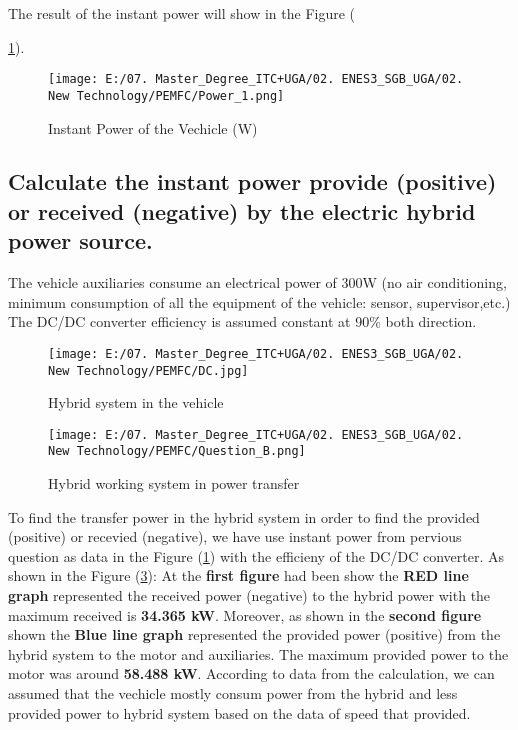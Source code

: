 \documentclass[12pt,a4paper]{article}
\numberwithin{equation}{section}
\begin{document}
	 The result of the instant power will show in the Figure ({\ref{5}).
	 
	 \begin{figure}[h]
	 	\centering 
	 	\texttt{[image: E:/07. Master\_Degree\_ITC+UGA/02. ENES3\_SGB\_UGA/02. New Technology/PEMFC/Power\_1.png]}
	 	\caption{\small {Instant Power of the Vechicle (W)}}
	 	\label{5}
	 \end{figure}
	

	\subsection{Calculate the instant power provide (positive) or received (negative) by the electric hybrid power source. }
	
	The vehicle auxiliaries consume an electrical power of 300W (no air conditioning, minimum consumption of all the equipment of the vehicle: sensor, supervisor,etc.) The DC/DC converter efficiency is assumed constant at 90\% both direction.
	
	\begin{figure}[h]
		\centering 
		\texttt{[image: E:/07. Master\_Degree\_ITC+UGA/02. ENES3\_SGB\_UGA/02. New Technology/PEMFC/DC.jpg]}
		\caption{\small {Hybrid system in the vehicle}}
		\label{6}
	\end{figure}
\newpage
	\begin{figure}[h]
		\centering 
		\texttt{[image: E:/07. Master\_Degree\_ITC+UGA/02. ENES3\_SGB\_UGA/02. New Technology/PEMFC/Question\_B.png]}
		\caption{\small {Hybrid working system in power transfer}}
		\label{7}
	\end{figure}
	To find the transfer power in the hybrid system in order to find the provided (positive) or recevied (negative), we have use instant power from pervious question as data in the Figure (\ref{5}) with the efficieny of the DC/DC converter. As shown in the Figure (\ref{7}): At the \textbf{first figure} had been show the \textbf{RED line graph} represented the received power (negative) to the hybrid power with the maximum received is \textbf{34.365 kW}. Moreover, as shown in the \textbf{second figure} shown the \textbf{Blue line graph} represented the provided power (positive) from the hybrid system to the motor and auxiliaries. The maximum provided power to the motor was around \textbf{58.488 kW}. According to data from the calculation, we can assumed that the vechicle mostly consum power from the hybrid and less provided power to hybrid system based on the data of speed that provided. 
	
}
\end{document}
